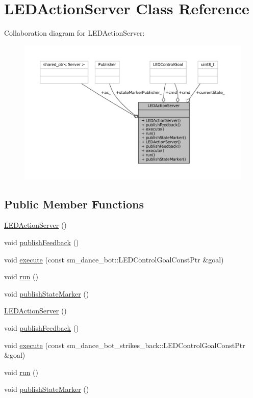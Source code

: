 \hypertarget{classLEDActionServer}{}\section{L\+E\+D\+Action\+Server Class Reference}
\label{classLEDActionServer}


Collaboration diagram for L\+E\+D\+Action\+Server\+:
\nopagebreak
\begin{figure}[H]
\begin{center}
\leavevmode
\includegraphics[width=350pt]{classLEDActionServer__coll__graph}
\end{center}
\end{figure}
\subsection*{Public Member Functions}
\begin{DoxyCompactItemize}
\item 
\hyperlink{classLEDActionServer_a6978c43940438b9fd8bfcd6b443092d3}{L\+E\+D\+Action\+Server} ()
\item 
void \hyperlink{classLEDActionServer_a25c93d4e7ecdacbb4f5b090d7789aa36}{publish\+Feedback} ()
\item 
void \hyperlink{classLEDActionServer_a2d8b9dfca1912e24170ef69a5edf5e9b}{execute} (const sm\+\_\+dance\+\_\+bot\+::\+L\+E\+D\+Control\+Goal\+Const\+Ptr \&goal)
\item 
void \hyperlink{classLEDActionServer_ae8e1b2d4bf0a85eec3ffd1c7d4f08490}{run} ()
\item 
void \hyperlink{classLEDActionServer_a73bb754ac2347c50660624ad92315895}{publish\+State\+Marker} ()
\item 
\hyperlink{classLEDActionServer_a6978c43940438b9fd8bfcd6b443092d3}{L\+E\+D\+Action\+Server} ()
\item 
void \hyperlink{classLEDActionServer_a25c93d4e7ecdacbb4f5b090d7789aa36}{publish\+Feedback} ()
\item 
void \hyperlink{classLEDActionServer_aea69ee96367e9f6a82d6302f148505d6}{execute} (const sm\+\_\+dance\+\_\+bot\+\_\+strikes\+\_\+back\+::\+L\+E\+D\+Control\+Goal\+Const\+Ptr \&goal)
\item 
void \hyperlink{classLEDActionServer_ae8e1b2d4bf0a85eec3ffd1c7d4f08490}{run} ()
\item 
void \hyperlink{classLEDActionServer_a73bb754ac2347c50660624ad92315895}{publish\+State\+Marker} ()
\end{DoxyCompactItemize}

